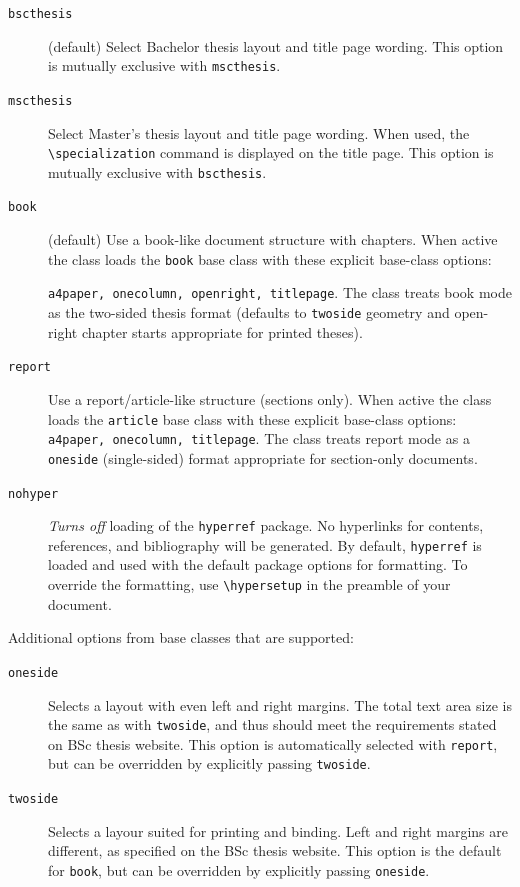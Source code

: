 \documentclass[11pt]{article}
\begin{document}
\begin{description}
  \item[\texttt{bscthesis}] (default)
    Select Bachelor thesis layout and title page wording. This option is mutually exclusive with \texttt{mscthesis}.
  \item[\texttt{mscthesis}] 
      Select Master's thesis layout and title page wording. When used, the \verb|\specialization| command is 
      displayed on the title page.
      This option is mutually exclusive with \texttt{bscthesis}.
  \item[\texttt{book}] (default)
    Use a book-like document structure with chapters. When active the class loads the \verb|book| base class 
    with these explicit base-class options: 
    
    \texttt{a4paper, onecolumn, openright, titlepage}.
    The class treats book mode as the two-sided thesis format (defaults to \texttt{twoside} geometry and 
    open-right chapter starts appropriate for printed theses).
  \item[\texttt{report}]
    Use a report/article-like structure (sections only). When active the class loads the \texttt{article} 
    base class with these explicit base-class options: \texttt{a4paper, onecolumn, titlepage}.
    The class treats report mode as a \texttt{oneside} (single-sided) format appropriate for section-only documents.
  \item[\texttt{nohyper}] \emph{Turns off} loading of the \texttt{hyperref} package. No hyperlinks for contents, references, 
    and bibliography will be generated. 
    By default, \texttt{hyperref} is loaded and used with the default package options for formatting. To override
    the formatting, use \verb|\hypersetup| in the preamble of your document.
\end{description}

\noindent Additional options from base classes that are supported:

\begin{description}
  \item[\texttt{oneside}] Selects a layout with even left and right margins. The total text area size is the
    same as with \texttt{twoside}, and thus should meet the requirements stated on BSc thesis website.
    This option is automatically selected with \texttt{report}, but can be overridden by explicitly passing \texttt{twoside}.
  \item[\texttt{twoside}] Selects a layour suited for printing and binding. Left and right margins are different,
    as specified on the BSc thesis website. This option is the default for \texttt{book}, but can be overridden
    by explicitly passing \texttt{oneside}.
\end{description}
\end{document}
